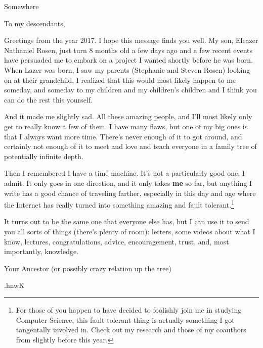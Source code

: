 \documentclass[]{letter}
\begin{document}

\begin{letter}{Somewhere }
\address{Rosen Manor}

\opening{To my descendants,}


Greetings from the year 2017.
I hope this message finds you well.
My son, Eleazer Nathaniel Rosen, just turn 8 months old a few days ago and a few recent events have persuaded me to embark on a project I wanted shortly before he was born.
When Lazer was born, I saw my parents (Stephanie and Steven Rosen) looking on at their grandchild, I realized that this would most likely happen to me someday, and someday to my children and my children's children and I think you can do the rest this yourself.

And it made me slightly sad.
All these amazing people, and I'll most likely only get to really know a few of them.
I have many flaws, but one of my big ones is that I always want more time.
There's never enough of it to got around, and certainly not enough of it to meet and love and teach everyone in a family tree of potentially infinite depth.


Then I remembered I have a time machine.
It's not a particularly good one, I admit. 
It only goes in one direction, and it only takes \textbf{me} so far, but anything I write has a good chance of traveling farther, especially in this day and age where the Internet has really turned into something amazing and fault tolerant.\footnote{For those of you happen to have decided to foolishly join me in studying Computer Science, this fault tolerant thing is actually something I got tangentally involved in.  Check out my research and those of my coauthors from slightly before this year. }

It turns out to be the same one that everyone else has, but I can use it to send you all sorts of things (there's plenty of room):
letters, some videos about what I know, lectures, congratulations, advice, encouragement, trust, and, most importantly, knowledge.

%
%

\signature{Professor Andrew Benjamin Rosen}

\closing{Your Ancestor (or possibly crazy relation up the tree) }



\begin{cjhebrew}
	.hnwK
\end{cjhebrew}
\end{letter}
\end{document}
